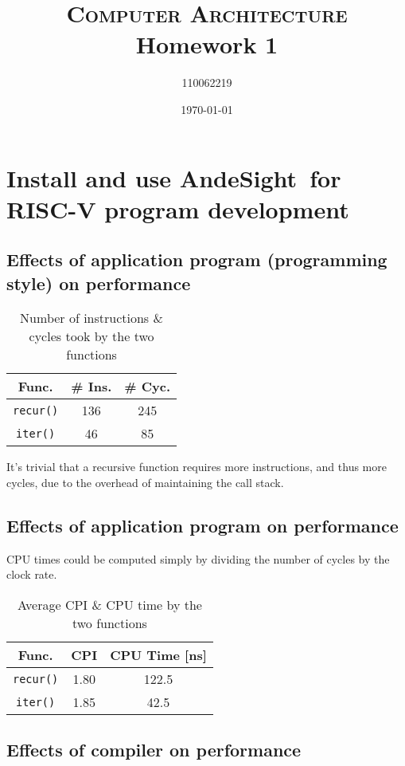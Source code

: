 \documentclass[12pt, a4paper]{article}
\title{\textsc{Computer Architecture} Homework 1}
\author{110062219}
\date{\today}
\begin{document}
\maketitle

\tableofcontents

\section{Install and use AndeSight\texttrademark\ for RISC-V program development}

\subsection{Effects of application program (programming style) on performance}

\begin{table}[H]
\caption{Number of instructions \& cycles took by the two functions}
\centering
\begin{tabular}{c||c|c}
Func. & \# Ins. & \# Cyc. \\
\hline\hline
\texttt{recur()} & 136 & 245 \\
\texttt{iter()} & 46 & 85
\end{tabular}
\label{tab:inc_cyc}
\end{table}

It's trivial that a recursive function requires more instructions, and thus more cycles, due to the overhead of maintaining the call stack.

\subsection{Effects of application program on performance}

CPU times could be computed simply by dividing the number of cycles by the clock rate.

\begin{table}[H]
\caption{Average CPI \& CPU time by the two functions}
\centering
\begin{tabular}{c||c|c}
Func. & CPI & CPU Time [ns] \\
\hline\hline
\texttt{recur()} & 1.80 & 122.5 \\
\texttt{iter()} & 1.85 & 42.5
\end{tabular}
\label{tab:cpi_time}
\end{table}

\subsection{Effects of compiler on performance}
\end{document}
